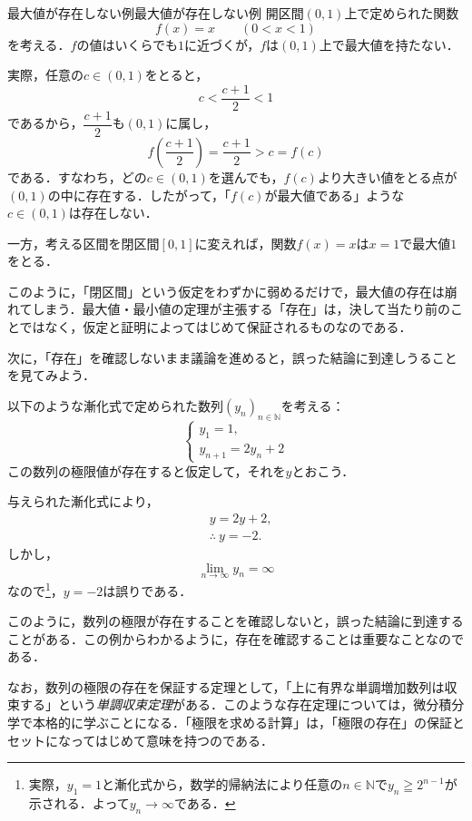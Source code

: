 \begin{example}{最大値が存在しない例}{最大値が存在しない例}
  開区間$(0,1)$上で定められた関数
  \[
    f(x) = x \qquad (0 < x < 1)
  \]
  を考える．$f$の値はいくらでも$1$に近づくが，$f$は$(0,1)$上で最大値を持たない．

  実際，任意の$c \in (0,1)$をとると，
  \[
    c < \frac{c+1}{2} < 1
  \]
  であるから，$\dfrac{c+1}{2}$も$(0,1)$に属し，
  \[
    f\!\left(\frac{c+1}{2}\right) = \frac{c+1}{2} > c = f(c)
  \]
  である．すなわち，どの$c \in (0,1)$を選んでも，$f(c)$より大きい値をとる点が$(0,1)$の中に存在する．したがって，「$f(c)$が最大値である」ような$c \in (0,1)$は存在しない．

  一方，考える区間を閉区間$[0,1]$に変えれば，関数$f(x)=x$は$x=1$で最大値$1$をとる．
\end{example}

このように，「閉区間」という仮定をわずかに弱めるだけで，最大値の存在は崩れてしまう．最大値・最小値の定理が主張する「存在」は，決して当たり前のことではなく，仮定と証明によってはじめて保証されるものなのである．

次に，「存在」を確認しないまま議論を進めると，誤った結論に到達しうることを見てみよう．


以下のような漸化式で定められた数列$(y_n)_{n \in \mathbb{N}}$を考える：
\[
  \begin{cases}
    y_1 =1 , \\
    y_{n+1}= 2y_n +2
  \end{cases}
\]
この数列の極限値が存在すると仮定して，それを$y$とおこう．
\begin{tleftbar}
  与えられた漸化式により，
  \begin{align*}
     & y = 2y +2,           \\
     & \therefore ~ y = -2.
  \end{align*}
  しかし，
  \[
    \lim_{n \to \infty} y_n = \infty
  \]
  なので\footnote{実際，$y_1 = 1$と漸化式から，数学的帰納法により任意の$n \in \mathbb{N}$で$y_n \geqq 2^{n-1}$が示される．よって$y_n \to \infty$である．}，$y=-2$は誤りである．
\end{tleftbar}

このように，数列の極限が存在することを確認しないと，誤った結論に到達することがある．この例からわかるように，存在を確認することは重要なことなのである．

なお，数列の極限の存在を保証する定理として，「上に有界な単調増加数列は収束する」という\emph{単調収束定理}がある．このような存在定理については，微分積分学で本格的に学ぶことになる．「極限を求める計算」は，「極限の存在」の保証とセットになってはじめて意味を持つのである．

